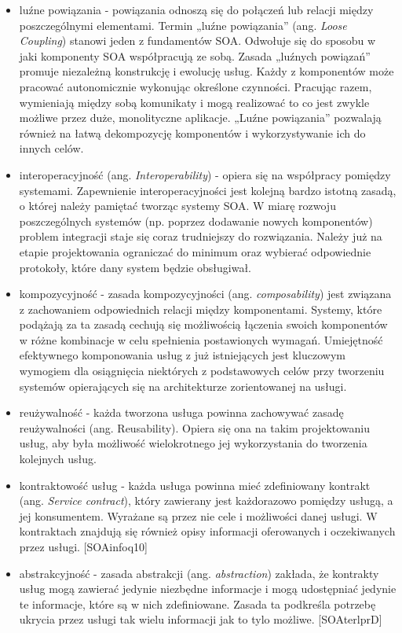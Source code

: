\begin{itemize}
\item{luźne powiązania - powiązania odnoszą się do połączeń lub relacji między poszczególnymi elementami. Termin „luźne powiązania” (ang. \emph{Loose Coupling}) stanowi jeden z fundamentów SOA. \cite{SOAsdj102009} Odwołuje się do sposobu w jaki komponenty SOA współpracują ze sobą.  Zasada „luźnych powiązań” promuje niezależną konstrukcję i ewolucję usług. Każdy z komponentów może pracować autonomicznie wykonując określone czynności. Pracując razem, wymieniają między sobą komunikaty i mogą realizować to co jest zwykle możliwe przez duże, monolityczne aplikacje. „Luźne powiązania” pozwalają również na łatwą dekompozycję komponentów i wykorzystywanie ich do innych celów.}
\item{interoperacyjność (ang. \emph{Interoperability}) - opiera się na współpracy pomiędzy systemami. Zapewnienie interoperacyjności jest kolejną bardzo istotną zasadą, o której należy pamiętać tworząc systemy SOA. W miarę rozwoju poszczególnych systemów (np. poprzez dodawanie nowych komponentów) problem integracji staje się coraz trudniejszy do rozwiązania. Należy już na etapie projektowania ograniczać do minimum oraz wybierać odpowiednie protokoły, które dany system będzie obsługiwał. \cite{SOAsdj102009}}
\item{kompozycyjność - zasada kompozycyjności (ang. \emph{composability}) jest związana z zachowaniem odpowiednich relacji między komponentami. Systemy, które podążają za ta zasadą cechują się możliwością łączenia swoich komponentów w różne kombinacje w celu spełnienia postawionych wymagań. Umiejętność efektywnego komponowania usług z już istniejących jest kluczowym wymogiem dla osiągnięcia niektórych z podstawowych celów przy tworzeniu systemów opierających się na architekturze zorientowanej na usługi.}
\item{reużywalność - każda tworzona usługa powinna zachowywać zasadę reużywalności (ang. Reusability).  Opiera się ona na takim projektowaniu usług, aby była możliwość wielokrotnego jej wykorzystania do tworzenia kolejnych usług. \cite{SOAsdj102009}}
\item{kontraktowość usług - każda usługa powinna mieć zdefiniowany kontrakt (ang. \emph{Service contract}), który zawierany jest każdorazowo pomiędzy usługą, a jej konsumentem. Wyrażane są przez nie cele i możliwości danej usługi. W kontraktach znajdują się również opisy informacji oferowanych  i oczekiwanych przez usługi. [SOAinfoq10]}
\item{abstrakcyjność - zasada abstrakcji (ang. \emph{abstraction}) zakłada, że kontrakty usług mogą zawierać jedynie niezbędne informacje i mogą udostępniać jedynie te informacje, które są w nich zdefiniowane. Zasada ta podkreśla potrzebę ukrycia przez usługi tak wielu informacji jak to tylo możliwe. [SOAterlprD]}

\end{itemize}
